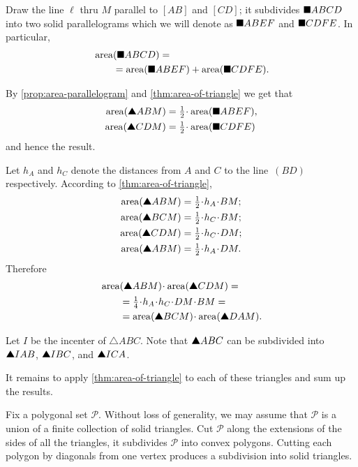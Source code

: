 Draw the line $\ell$ 
thru $M$ parallel to $[AB]$ and $[CD]$;
it subdivides $\blacksquare ABCD$ into two solid parallelograms
which we will denote as
$\blacksquare ABEF$ and
$\blacksquare CDFE$.
In particular,
\begin{align*}
&\mathop{\rm area}\nolimits(\blacksquare ABCD)=
\\
&\qquad=
\mathop{\rm area}\nolimits(\blacksquare ABEF)+\mathop{\rm area}\nolimits(\blacksquare CDFE).
\end{align*}

By \ref{prop:area-parallelogram} and \ref{thm:area-of-triangle} we get that 
\begin{align*}
\area(\solidtriangle ABM)&=\tfrac12\cdot\area(\solidsquare ABEF),
\\
\area(\solidtriangle CDM)&=\tfrac12\cdot\area(\solidsquare CDFE)
\end{align*}
and hence the result.

Let $h_A$ and $h_C$ denote the distances from $A$ and $C$ to the line~$(BD)$ respectively.
According to \ref{thm:area-of-triangle},
\begin{align*}
\area(\solidtriangle ABM)&=\tfrac12\cdot h_A\cdot BM;
\\
\area(\solidtriangle BCM)&=\tfrac12\cdot h_C\cdot BM;
\\
\area(\solidtriangle CDM)&=\tfrac12\cdot h_C\cdot DM;
\\
\area(\solidtriangle ABM)&=\tfrac12\cdot h_A\cdot DM.
\end{align*}
Therefore
\begin{align*}
&\area(\solidtriangle ABM)\cdot \area(\solidtriangle CDM)=
\\
&\qquad=\tfrac14 \cdot h_A\cdot h_C\cdot DM\cdot BM=
\\
&\qquad=\area(\solidtriangle BCM)\cdot \area(\solidtriangle DAM).
\end{align*}

Let $I$ be the incenter of $\triangle ABC$.
Note that $\solidtriangle ABC$
can be subdivided into 
$\solidtriangle IAB$, 
$\solidtriangle IBC$,
and $\solidtriangle ICA$.

It remains to apply \ref{thm:area-of-triangle} 
to each of these triangles and sum up the results.

 Fix a polygonal set $\mathcal{P}$.
Without loss of generality, we may assume that $\mathcal{P}$ is a union of a finite collection of solid triangles.
Cut $\mathcal{P}$ along the extensions of the sides of all the triangles,
it subdivides $\mathcal{P}$ into convex polygons.
Cutting each polygon by diagonals from one vertex produces a subdivision into solid triangles.


